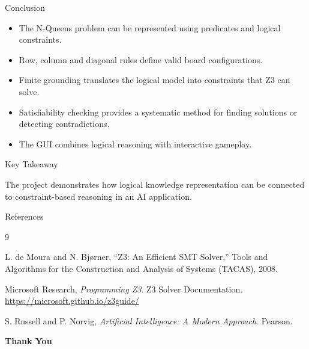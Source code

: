 \documentclass[aspectratio=169,12pt]{beamer}
\begin{document}
\begin{frame}{Conclusion}

\begin{itemize}
    \item The N-Queens problem can be represented using
          predicates and logical constraints.
    \item Row, column and diagonal rules define valid
          board configurations.
    \item Finite grounding translates the logical model
          into constraints that Z3 can solve.
    \item Satisfiability checking provides a systematic
          method for finding solutions or detecting
          contradictions.
    \item The GUI combines logical reasoning with
          interactive gameplay.
\end{itemize}

\vspace{0.3cm}

\begin{block}{Key Takeaway}

The project demonstrates how logical knowledge
representation can be connected to constraint-based
reasoning in an AI application.
\end{block}

\end{frame}


\begin{frame}[allowframebreaks]{References}

\begin{thebibliography}{9}

L. de Moura and N. Bj{\o}rner,
\newblock ``Z3: An Efficient SMT Solver,''
\newblock Tools and Algorithms for the Construction and
Analysis of Systems (TACAS), 2008.

Microsoft Research,
\newblock \textit{Programming Z3}.
\newblock Z3 Solver Documentation.
\newblock \url{https://microsoft.github.io/z3guide/}

S. Russell and P. Norvig,
\newblock \textit{Artificial Intelligence: A Modern Approach}.
\newblock Pearson.

\end{thebibliography}

\end{frame}


\begin{frame}[plain]

\begin{center}

\vspace{1.5cm}

{\Huge\color{PastelBlue}\textbf{Thank You}}

\vspace{0.6cm}

\end{center}

\end{frame}
\end{document}
